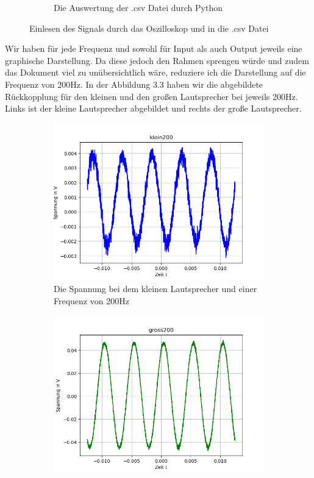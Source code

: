 \documentclass[12pt, oneside, a4paper, \docLanguage]{report}
\begin{document}
\begin{figure}[H]
\begin{subfigure}{.5\textwidth}
  \caption{Die Auswertung der .csv Datei durch Python}
  \label{fig:Die Auswertung der .csv Datei durch Python}
\end{subfigure}
\caption{Einlesen des Signals durch das Oszilloskop und in die .csv Datei}
\label{fig:Einlesen des Signals durch das Oszilloskop und in die .csv Datei}
\end{figure}
Wir haben für jede Frequenz und sowohl für Input als auch Output jeweils eine graphische Darstellung.
Da diese jedoch den Rahmen sprengen würde und zudem das Dokument viel zu unübersichtlich wäre, reduziere ich die Darstellung auf die Frequenz von 200Hz.
\newpage
In der Abbildung 3.3 haben wir die abgebildete Rückkopplung für den kleinen und den großen Lautsprecher bei jeweils 200Hz.
Links ist der kleine Lautsprecher abgebildet und rechts der große Lautsprecher.
\begin{figure}[H]
\centering
\begin{subfigure}{.5\textwidth}
  \centering
  \includegraphics[width=0.9\linewidth]{../data/img/klein200.png}
  \caption{Die Spannung bei dem kleinen Lautsprecher und einer Frequenz von 200Hz}
  \label{fig:Die Spannung bei dem kleinen Lautsprecher und einer Frequenz von 200Hz}
\end{subfigure}%
\begin{subfigure}{.5\textwidth}
  \centering
  \includegraphics[width=0.9\linewidth]{../data/img/gross200.png}

\end{subfigure}
\end{figure}
\end{document}
